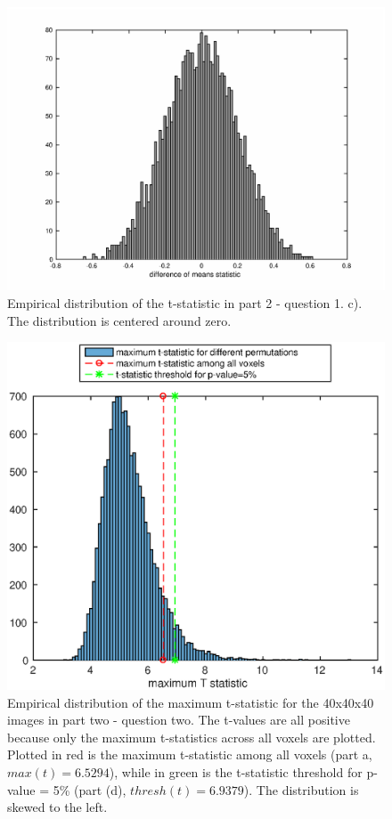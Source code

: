 \documentclass[11pt,a4paper,oneside]{report}
\begin{document}
\begin{figure}[H]
\centering
 \includegraphics[scale = 0.7]{figures/p21_c.eps}
 \caption{Empirical distribution of the t-statistic in part 2 - question 1. c). The distribution is centered around zero.}
 \label{p21c}
\end{figure}

\begin{figure}[H]
\centering
 \includegraphics[scale = 0.9]{figures/p22_b.eps}
 \caption{Empirical distribution of the maximum t-statistic for the 40x40x40 images in part two - question two. The t-values are all positive because only the maximum t-statistics across all voxels are plotted. Plotted in red is the maximum t-statistic among all voxels (part a, $max(t) = 6.5294$), while in green is the t-statistic threshold for p-value = 5\% (part (d), $thresh(t) = 6.9379$). The distribution is skewed to the left.}
 \label{p22b}
\end{figure}
\end{document}
